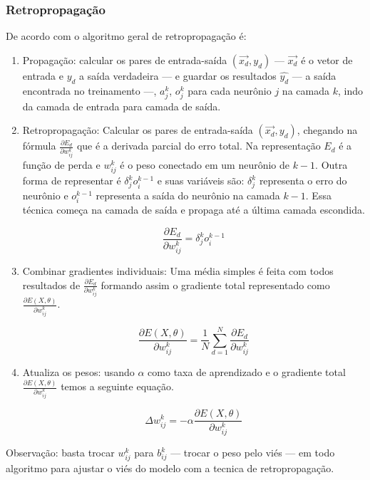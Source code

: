 \subsubsection*{Retropropagação}

De acordo com  o algoritmo geral de retropropagação é:

\begin{enumerate}
    \item Propagação: calcular os pares de entrada-saída $(\overrightarrow{x_d}, y_d)$ — $\overrightarrow{x_d}$ é o vetor de entrada e $y_d$ a saída verdadeira — e guardar os resultados $\hat{y_d}$ — a saída encontrada no treinamento —, $a_j^k$, $o_j^k$ para cada neurônio $j$ na camada $k$, indo da camada de entrada para camada de saída.
    
    \item Retropropagação: Calcular os pares de entrada-saída $(\overrightarrow{x_d}, y_d)$, chegando na fórmula $\frac{\partial{E_d}}{\partial{w_{ij}^k}}$ que é a derivada parcial do erro total. Na representação $E_d$ é a função de perda e $w_{ij}^k$ é o peso  conectado em um neurônio de $k - 1$. Outra forma de representar é $\delta_j^k o_i^{k - 1}$ e suas variáveis são: $\delta_j^k$ representa o erro do neurônio e $o_i^{k - 1}$ representa a saída do neurônio na camada $k -1$. Essa técnica começa na camada de saída e propaga até a última camada escondida.
    
    $$ \frac{\partial{E_d}}{\partial{w_{ij}^k}} = \delta_j^k o_i^{k - 1} $$
    
    \item Combinar gradientes individuais: Uma média simples é feita com todos resultados de $\frac{\partial{E_d}}{\partial{w_{ij}^k}}$ formando assim o gradiente total representado como $\frac{\partial{E(X, \theta)}}{\partial{w_{ij}^k}}$.
    
    $$ \frac{\partial{E(X,\theta)}}{\partial{w_{ij}^k}} = \frac{1}{N} \sum_{d=1}^{N} \frac{\partial{E_d}}{\partial{w_{ij}^k}} $$
    \item Atualiza os pesos: usando $\alpha$ como taxa de aprendizado e o gradiente total $\frac{\partial{E(X, \theta)}}{\partial{w_{ij}^k}}$ temos a seguinte equação.
    
    $$ \Delta w_{ij}^k = -\alpha \frac{\partial{E(X,\theta)}}{\partial{w_{ij}^k}} $$
\end{enumerate}

Observação: basta trocar $w_{ij}^k$ para $b_{ij}^k$ — trocar o peso pelo viés — em todo algoritmo para ajustar o viés do modelo com a tecnica de retropropagação.
